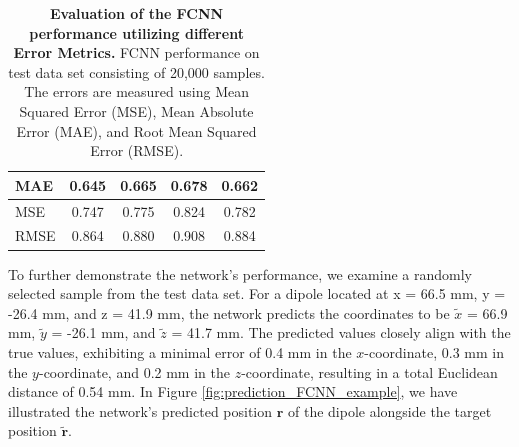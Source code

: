 \documentclass[a4paper, UKenglish, 11pt]{uiomaster}
\begin{document}
\begin{table}[!htb]
\begin{tabular}{l|cccc|}
\multicolumn{1}{|l|}{\cellcolor[HTML]{EFEFEF}MAE}  & \multicolumn{1}{c|}{0.645}                                                                                  & \multicolumn{1}{c|}{0.665}                                                                                   & \multicolumn{1}{c|}{0.678}                                                                                   & 0.662                                                                                                              \\ \hline
\multicolumn{1}{|l|}{\cellcolor[HTML]{EFEFEF}MSE}  & \multicolumn{1}{c|}{0.747}                                                                                  & \multicolumn{1}{c|}{0.775}                                                                                   & \multicolumn{1}{c|}{0.824}                                                                                   & 0.782                                                                                                              \\ \hline
\multicolumn{1}{|l|}{\cellcolor[HTML]{EFEFEF}RMSE} & \multicolumn{1}{c|}{0.864}                                                                                  & \multicolumn{1}{c|}{0.880}                                                                                   & \multicolumn{1}{c|}{0.908}                                                                                   & 0.884                                                                                                              \\ \hline
\end{tabular}
\caption{\textbf{Evaluation of the FCNN performance utilizing different Error Metrics.} \newline
FCNN performance on test data set consisting of 20,000 samples. The errors are measured using Mean Squared Error (MSE), Mean Absolute Error (MAE), and Root Mean Squared Error (RMSE).}
\label{ch6-table:error_simple_dipole}
\end{table}

To further demonstrate the network's performance, we examine a randomly selected sample from the test data set. For a dipole located at x = 66.5 mm, y = -26.4 mm, and z = 41.9 mm, the network predicts the coordinates to be $\tilde{x}$ = 66.9 mm, $\tilde{y}$ = -26.1 mm, and $\tilde{z}$ = 41.7 mm. The predicted values closely align with the true values, exhibiting a minimal error of 0.4 mm in the $x$-coordinate, 0.3 mm in the $y$-coordinate, and 0.2 mm in the $z$-coordinate, resulting in a total Euclidean distance of 0.54 mm. In Figure \ref{fig:prediction_FCNN_example}, we have illustrated the network's predicted position $\mathbf{r}$ of the dipole alongside the target position $\mathbf{\tilde{r}}$.
\end{document}
